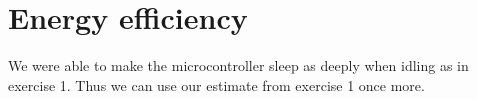 \section{Energy efficiency}

We were able to make the microcontroller sleep as deeply when idling as in exercise 1. Thus we can use our estimate from exercise 1 \cite[section 3.2]{exercise1report} once more. 
